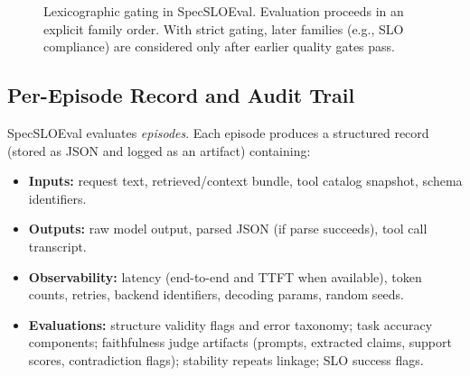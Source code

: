 \begin{figure}[t]
\centering
{}
\caption{Lexicographic gating in SpecSLOEval.
Evaluation proceeds in an explicit family order.
With strict gating, later families (e.g., SLO compliance) are considered only after earlier quality gates pass.}
\label{fig:criteria-gating}
\end{figure}

\subsection{Per-Episode Record and Audit Trail}
\label{sec:episode-record}

SpecSLOEval evaluates \emph{episodes}. Each episode produces a structured record (stored as JSON and logged as an artifact) containing:

\begin{itemize}[leftmargin=12pt]
    \item \textbf{Inputs:} request text, retrieved/context bundle, tool catalog snapshot, schema identifiers.
    \item \textbf{Outputs:} raw model output, parsed JSON (if parse succeeds), tool call transcript.
    \item \textbf{Observability:} latency (end-to-end and TTFT when available), token counts, retries, backend identifiers, decoding params, random seeds.
    \item \textbf{Evaluations:} structure validity flags and error taxonomy; task accuracy components; faithfulness judge artifacts (prompts, extracted claims, support scores, contradiction flags); stability repeats linkage; SLO success flags.
\end{itemize}

